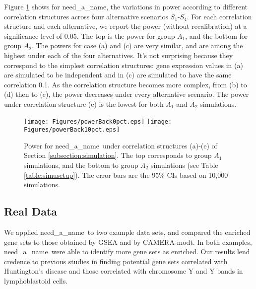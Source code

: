 \documentclass[useAMS,usenatbib, galley]{biom}
\newcommand{\OurMethod}{need\_a\_name}
\newcommand{\aaCase}{a}
\newcommand{\aCase}{b}
\newcommand{\cCase}{c}
\newcommand{\eCase}{d}
\newcommand{\fCase}{e}
\newcommand{\CMT}{CAMERA-modt}
\begin{document}
	
	
	Figure \ref{fig:power} shows for \OurMethod, the variations in power according to different correlation structures across four alternative scenarios $S_1$-$S_4$. For each correlation structure and each alternative, we report the power (without recalibration) at a significance level of 0.05. The top is the power for group $A_1$, and the bottom for group $A_2$.  The powers for case (\aaCase) and (\cCase) are very similar, and are among the highest under each of the four alternatives. It's not surprising because they correspond to the simplest correlation structures: gene expression values in (\aaCase) are simulated to be independent and in (\cCase) are simulated to have the same correlation 0.1. As the correlation structure becomes more complex, from (\aCase) to (\eCase) then to (\fCase), the power decreases under every alternative scenario. The power under correlation structure (\fCase) is the lowest for both $A_1$ and $A_2$ simulations.%
	
	\begin{figure}
		\begin{center}
			\texttt{[image: Figures/powerBack0pct.eps]}
			\texttt{[image: Figures/powerBack10pct.eps]}
		\end{center} 
			\caption{Power for \OurMethod~under correlation structures (\aaCase)-(\fCase) of Section \ref{subsection:simulation}. The top corresponds to group $A_1$ simulations, and the bottom to group $A_2$ simulations (see Table \ref{table:simusetup}). The error bars are the $95\%$ CIs based on 10,000 simulations. }\label{fig:power}
	\end{figure} 
	
	\subsection{Real Data}\label{section:realdata}
	We applied \OurMethod~to two example data sets, and compared the enriched gene sets to those obtained by GSEA and by \CMT. In both examples, \OurMethod~were able to identify more gene sets as enriched. Our results lend credence to previous studies in finding potential gene sets correlated with Huntington's disease and those correlated with chromosome Y and Y bands in lymphoblastoid cells.  
	
\end{document}
